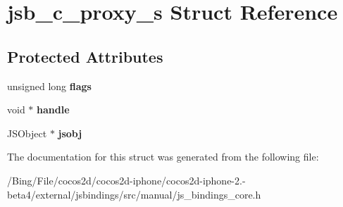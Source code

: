 \hypertarget{structjsb__c__proxy__s}{\section{jsb\-\_\-c\-\_\-proxy\-\_\-s Struct Reference}
\label{structjsb__c__proxy__s}
}
\subsection*{Protected Attributes}
\begin{DoxyCompactItemize}
\item 
\hypertarget{structjsb__c__proxy__s_a8bf30e17a0fe15f75072650c927e632d}{unsigned long {\bfseries flags}}\label{structjsb__c__proxy__s_a8bf30e17a0fe15f75072650c927e632d}

\item 
\hypertarget{structjsb__c__proxy__s_a32ceebe467dcecf3f15b98e74b276a8c}{void $\ast$ {\bfseries handle}}\label{structjsb__c__proxy__s_a32ceebe467dcecf3f15b98e74b276a8c}

\item 
\hypertarget{structjsb__c__proxy__s_afbfb2061abbc7f22475bbb936b5855aa}{J\-S\-Object $\ast$ {\bfseries jsobj}}\label{structjsb__c__proxy__s_afbfb2061abbc7f22475bbb936b5855aa}

\end{DoxyCompactItemize}


The documentation for this struct was generated from the following file\-:\begin{DoxyCompactItemize}
\item 
/\-Bing/\-File/cocos2d/cocos2d-\/iphone/cocos2d-\/iphone-\/2.-\/beta4/external/jsbindings/src/manual/js\-\_\-bindings\-\_\-core.\-h\end{DoxyCompactItemize}
